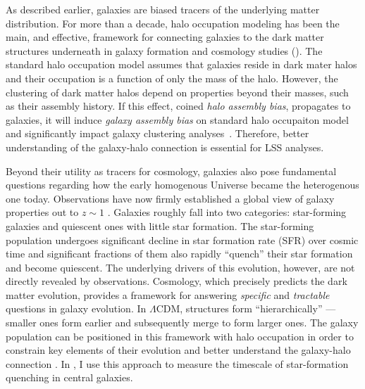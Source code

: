 As described earlier, galaxies are biased tracers of the 
underlying matter distribution. For more than a decade, halo occupation 
modeling has been the main, and effective, framework for connecting galaxies
to the dark matter structures underneath in galaxy formation and cosmology
studies (). The standard halo occupation model
assumes that galaxies reside in dark mater halos and their occupation 
is a function of only the mass of the halo. However, the clustering of dark 
matter halos depend on properties beyond their masses, such as their 
assembly history. If this effect, coined 
{\em halo assembly bias}, propagates to galaxies, it will induce 
{\em galaxy assembly bias} on standard halo occupaiton model and 
significantly impact galaxy clustering analyses~\citep[][]{hearin15}. 
Therefore, better understanding of the galaxy-halo connection is 
essential for LSS analyses. 

Beyond their utility as tracers for cosmology, galaxies also pose fundamental 
questions regarding how the early homogenous Universe became the heterogenous 
one today. Observations have now firmly established a global view of galaxy 
properties out to $z\sim1$ \citep[\emph{e.g.}][]{Blanton:2009aa, Moustakas:2013aa}.
Galaxies roughly fall into two categories: star-forming galaxies and 
quiescent ones with little star formation. The star-forming population 
undergoes significant decline in star formation rate (SFR) over cosmic 
time and significant fractions of them also rapidly ``quench'' their 
star formation and become quiescent. The underlying drivers of this 
evolution, however, are not directly revealed by observations.
Cosmology, which precisely predicts the dark matter evolution, provides 
a framework for answering {\em specific} and {\em tractable} questions 
in galaxy evolution.  In $\Lambda$CDM, structures form 
``hierarchically'' --- smaller ones form earlier and subsequently 
merge to form larger ones. The galaxy population can be positioned in 
this framework with halo occupation in order to constrain key elements 
of their evolution and better understand the galaxy-halo connection 
\citep[][]{Wetzel:2013aa}. In , I use
this approach to measure the timescale of star-formation quenching 
in central galaxies. 


